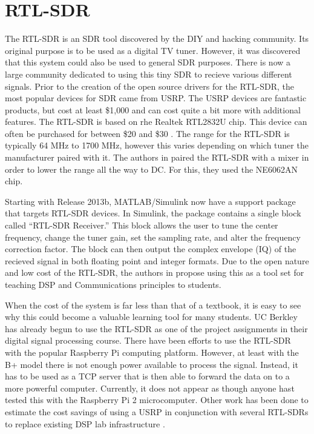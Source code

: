 \section{RTL-SDR}

	The RTL-SDR is an SDR tool discovered by the DIY and hacking community. Its original purpose is to be used as a digital TV tuner. However, it was discovered that this system could also be used to general SDR purposes. There is now a large community dedicated to using this tiny SDR to recieve various different signals. Prior to the creation of the open source drivers for the RTL-SDR, the most popular devices for SDR came from USRP. The USRP devices are fantastic products, but cost at least \$1,000 and can cost quite a bit more with additional features. The RTL-SDR is based on rhe Realtek RTL2832U chip. This device can often be purchased for between \$20 and \$30 \cite{6526525}. The range for the RTL-SDR is typically 64 MHz	to 1700 MHz, however this varies depending on which tuner the manufacturer paired with it. The authors in \cite{6526525} paired the RTL-SDR with a mixer in order to lower the range all the way to DC. For this, they used the NE6062AN chip.  
	
	Starting with Release 2013b, MATLAB/Simulink now have a support package that targets RTL-SDR devices. In Simulink, the package contains a single block called ``RTL-SDR Receiver.'' This block allows the user to tune the center frequency, change the tuner gain, set the sampling rate, and alter the frequency correction factor. The block can then output the complex envelope (IQ) of the recieved signal in both floating point and integer formats\cite{6893337}.  Due to the open nature and low cost of the RTL-SDR, the authors in \cite{6821718} propose using this as a tool set for teaching DSP and Communications principles to students. 
	
	When the cost of the system is far less than that of a
	textbook, it is easy to see why this could become a valuable learning tool for many students. UC Berkley has already begun to use the RTL-SDR as one of the project assignments in their digital signal processing course. 	There have been efforts to use the RTL-SDR with the popular Raspberry Pi computing platform. However, at least with the B+ model there is not enough power available to process the signal. Instead, it has to be used as a TCP server that is then able to forward the data on to a more powerful computer\cite{6938691}. Currently, it does not appear as though anyone hast tested this with the Raspberry Pi 2 microcomputer. Other work has been done to estimate the cost savings of using a USRP in conjunction with several RTL-SDRs to replace existing DSP lab infrastructure \cite{6726630}. 
	
